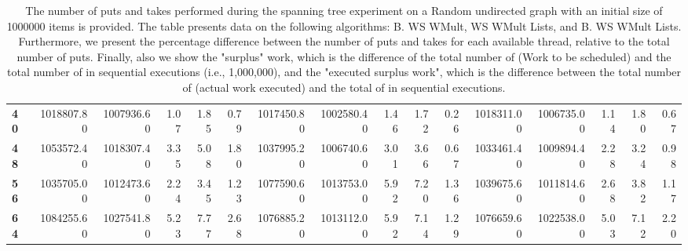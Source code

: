 \begin{table}[!ht]
{\begin{tabular}{lrrrrrrrrrrrrrrr}
\textbf{40} &  1018807.80 & 1007936.60 &           1.07 &        1.85 &                 0.79 &     1017450.80 & 1002580.40 &           1.46 &        1.72 &                 0.26 &        1018311.00 & 1006735.00 &           1.14 &        1.80 &                 0.67 \\
\textbf{48} &  1053572.40 & 1018307.40 &           3.35 &        5.08 &                 1.80 &     1037995.20 & 1006740.60 &           3.01 &        3.66 &                 0.67 &        1033461.40 & 1009894.40 &           2.28 &        3.24 &                 0.98 \\
\textbf{56} &  1035705.00 & 1012473.60 &           2.24 &        3.45 &                 1.23 &     1077590.60 & 1013753.00 &           5.92 &        7.20 &                 1.36 &        1039675.60 & 1011814.60 &           2.68 &        3.82 &                 1.17 \\
\textbf{64} &  1084255.60 & 1027541.80 &           5.23 &        7.77 &                 2.68 &     1076885.20 & 1013112.00 &           5.92 &        7.14 &                 1.29 &        1076659.60 & 1022538.00 &           5.03 &        7.12 &                 2.20 \\
\bottomrule
\end{tabular}}
\label{difference-Random_undirected-1000000-B_WS_NC_MULT_OPT-WS_NC_MULT_LA_OPT-B_WS_NC_MULT_LA_OPT}
\caption{The number of puts and takes performed during the
    spanning tree experiment on a Random undirected graph with an initial size
    of 1000000 items is provided. The table presents data on the
    following algorithms: B. WS WMult, WS WMult Lists, and
    B. WS WMult Lists. Furthermore, we present the percentage difference
    between the number of puts and takes for each available thread,
    relative to the total number of puts. Finally, also we show the
    "surplus" work, which is the difference of the total number of
    \Puts (Work to be scheduled) and the total number of \Puts in
    sequential executions (i.e., 1,000,000), and the "executed surplus
    work", which is the difference between the total number of \Takes
    (actual work executed) and the total of \Takes in sequential
    executions.}
\end{table}
